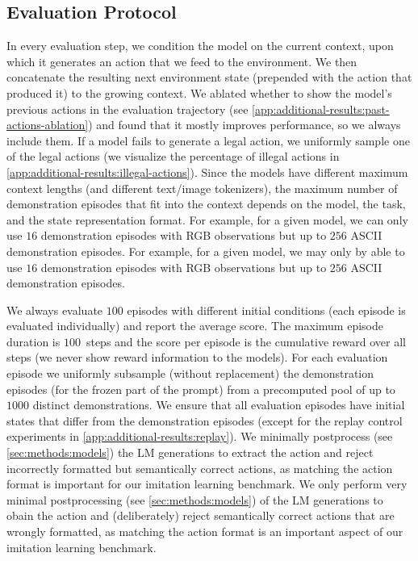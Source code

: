\subsection{Evaluation Protocol}
\label{sec:methods:evaluation-protocol}

In every evaluation step, we condition the model on the current context, upon which it generates an action that we feed to the environment.
We then concatenate the resulting next environment state (prepended with the action that produced it) to the growing context.
We ablated whether to show the model's previous actions in the evaluation trajectory (see \cref{app:additional-results:past-actions-ablation}) and found that it mostly improves performance, so we always include them.
If a model fails to generate a legal action, we uniformly sample one of the legal actions (we visualize the percentage of illegal actions in \cref{app:additional-results:illegal-actions}).
Since the models have different maximum context lengths (and different text/image tokenizers), the maximum number of demonstration episodes that fit into the context depends on the model, the task, and the state representation format.
\ificlr
For example, for a given model, we can only use $16$ demonstration episodes with RGB observations but up to $256$ ASCII demonstration episodes.
\else
For example, for a given model, we may only by able to use $16$ demonstration episodes with RGB observations but up to $256$ ASCII demonstration episodes.
\fi

We always evaluate $100$ episodes with different initial conditions (each episode is evaluated individually) and report the average score. 
The maximum episode duration is $100$~steps and the score per episode is the cumulative reward over all steps (we never show reward information to the models). 
For each evaluation episode we uniformly subsample (without replacement) the demonstration episodes (for the frozen part of the prompt) from a precomputed pool of up to $1000$ distinct demonstrations.
We ensure that all evaluation episodes have initial states that differ from the demonstration episodes (except for the replay control experiments in \cref{app:additional-results:replay}).
\ificlr
We minimally postprocess (see \cref{sec:methods:models}) the LM generations to extract the action and reject incorrectly formatted but semantically correct actions, as matching the action format is important for our imitation learning benchmark.
\else
We only perform very minimal postprocessing (see \cref{sec:methods:models}) of the LM generations to obain the action and (deliberately) reject semantically correct actions that are wrongly formatted, as matching the action format is an important aspect of our imitation learning benchmark.
\fi

